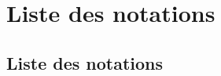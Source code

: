 \documentclass[nomencl, showmac]{mpg-preth}
\begin{document}
\ifincluded
  \chapter {Liste des notations}
\else
  \section*{Liste des notations}
\fi

\printnomenclature
\end{document}
